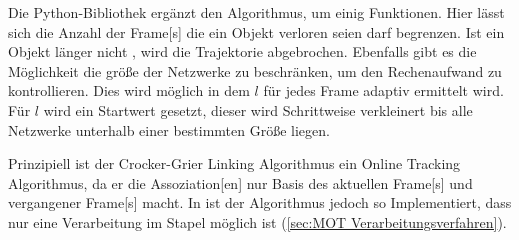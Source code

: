 Die \gls{Python}-\gls{Bibliothek} \cite{Allan.2023} ergänzt den Algorithmus, um einig Funktionen. Hier lässt sich die Anzahl der \gls{Frame}[s] die ein Objekt verloren seien darf begrenzen. Ist ein Objekt länger nicht , wird die \gls{Trajektorie} abgebrochen. Ebenfalls gibt es die Möglichkeit die größe der Netzwerke zu beschränken, um den Rechenaufwand zu kontrollieren. Dies wird möglich in dem \(l\) für jedes \gls{Frame} adaptiv ermittelt wird. Für \(l\) wird ein Startwert gesetzt, dieser wird Schrittweise verkleinert bis alle Netzwerke unterhalb einer bestimmten Größe liegen. \par

Prinzipiell ist der Crocker-Grier Linking Algorithmus ein \gls{Online Tracking} Algorithmus, da er die \gls{Assoziation}[en] nur Basis des aktuellen \gls{Frame}[s] und vergangener \gls{Frame}[s] macht. In \cite{Allan.2023} ist der Algorithmus jedoch so Implementiert, dass nur eine Verarbeitung im Stapel möglich ist (\ref{sec:MOT Verarbeitungsverfahren}). 

